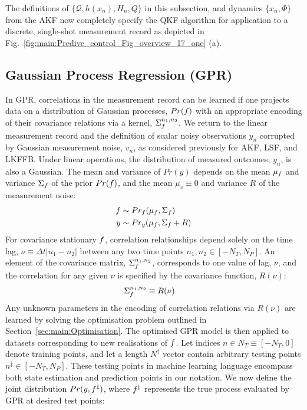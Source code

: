 The definitions of $\{ \mathcal{Q}, h(x_n), H_n, Q \}$ in this subsection, and dynamics $\{x_n, \Phi\}$ from the AKF now completely specify the QKF algorithm for application to a discrete, single-shot measurement record as depicted in Fig.~\ref{fig:main:Predive_control_Fig_overview_17_one} (a).  

\subsection{Gaussian Process Regression (GPR)}

In GPR, correlations in the measurement record can be learned if one projects data on a distribution of Gaussian processes, $Pr(f)$ with an appropriate encoding of their covariance relations via a kernel, $\Sigma_f^{n_1, n_2}$. We return to the linear measurement record and the definition of scalar noisy observations $y_{n}$ corrupted by Gaussian measurement noise, $v_n$, as considered previously for AKF, LSF, and LKFFB.  
Under linear operations, the distribution of measured outcomes, $y_n$, is also a Gaussian. The  mean and variance of $Pr(y)$  depends on the mean $\mu_f$ and variance $\Sigma_f$ of the prior $Pr(f)$, and the mean $\mu_v \equiv 0$ and variance $R$ of the measurement noise: 
\begin{align}
	f & \sim Pr_f(\mu_f,\Sigma_f ) \\
	y & \sim Pr_y(\mu_f,\Sigma_f + R ) 
\end{align}
For covariance stationary $f$, correlation relationships depend solely on the time lag, $\nu \equiv \Delta t|n_1 - n_2|$ between any two time points  $n_1, n_2 \in [-N_T, N_P]$.  An element of the covariance matrix, $\Sigma_f^{n_1,n_2}$, corresponds to one value of lag, $\nu$, and the correlation for any given $\nu$  is specified by the covariance function, $R(\nu)$:
\begin{align}
	\Sigma_f^{n_1,n_2} & \equiv R(\nu) 
\end{align}
Any unknown parameters in the encoding of correlation relations via $R(\nu)$ are learned by solving the optimisation problem outlined in Section~\ref{sec:main:Optimisation}. The optimised GPR model is then applied to datasets corresponding to new realisations of $f$. Let indices $n \in N_T \equiv [-N_T, 0]$ denote training points, and let a length $N^{\ddagger} $ vector contain arbitrary testing points $n^{\ddagger} \in [-N_T, N_P]$. These testing points in machine learning language encompass both state estimation and prediction points in our notation. We now define the joint distribution $Pr(y,f^{\ddagger})$, where $f^{\ddagger}$ represents the true process evaluated by GPR at desired test points: 
